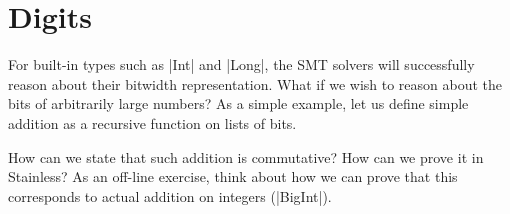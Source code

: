 \section{Digits}

For built-in types such as |Int| and |Long|, the SMT solvers will successfully
reason about their bitwidth representation. What if we wish to reason about the bits of arbitrarily
large numbers? As a simple example, let us define simple addition as a recursive function on lists
of bits.

How can we state that such addition is commutative? How can we prove it in Stainless?
As an off-line exercise, think about how we can prove that this corresponds to actual addition on integers (|BigInt|).
